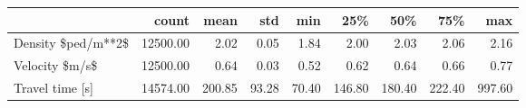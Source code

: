 \begin{tabular}{lrrrrrrrr}
\toprule
{} &    count &   mean &   std &   min &    25\% &    50\% &    75\% &    max \\
\midrule
Density \$ped/m**2\$ & 12500.00 &   2.02 &  0.05 &  1.84 &   2.00 &   2.03 &   2.06 &   2.16 \\
Velocity \$m/s\$     & 12500.00 &   0.64 &  0.03 &  0.52 &   0.62 &   0.64 &   0.66 &   0.77 \\
Travel time [s]    & 14574.00 & 200.85 & 93.28 & 70.40 & 146.80 & 180.40 & 222.40 & 997.60 \\
\bottomrule
\end{tabular}
